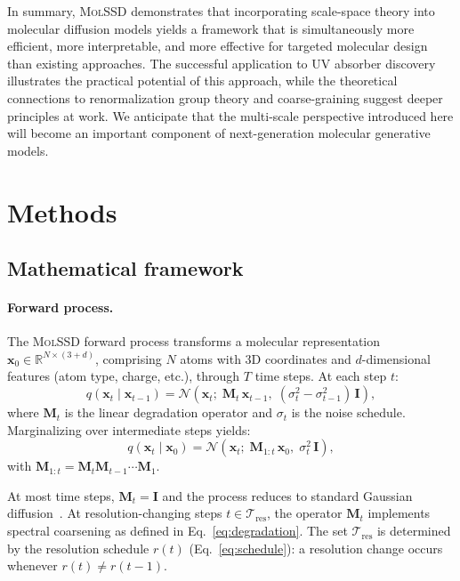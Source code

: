 \documentclass[11pt]{article}
\newcommand{\molssd}{\textsc{MolSSD}}
\newcommand{\vx}{\mathbf{x}}
\newcommand{\mM}{\mathbf{M}}
\newcommand{\mI}{\mathbf{I}}
\newcommand{\normal}{\mathcal{N}}
\newcommand{\R}{\mathbb{R}}
\begin{document}
In summary, \molssd{} demonstrates that incorporating scale-space theory into molecular diffusion models yields a framework that is simultaneously more efficient, more interpretable, and more effective for targeted molecular design than existing approaches. The successful application to UV absorber discovery illustrates the practical potential of this approach, while the theoretical connections to renormalization group theory and coarse-graining suggest deeper principles at work. We anticipate that the multi-scale perspective introduced here will become an important component of next-generation molecular generative models.


\section*{Methods}

\subsection*{Mathematical framework}

\paragraph{Forward process.}
The \molssd{} forward process transforms a molecular representation $\vx_0 \in \R^{N \times (3+d)}$, comprising $N$ atoms with 3D coordinates and $d$-dimensional features (atom type, charge, etc.), through $T$ time steps. At each step $t$:
\begin{equation}
\label{eq:forward_full}
    q(\vx_t \mid \vx_{t-1}) = \normal\!\left(\vx_t;\; \mM_t\,\vx_{t-1},\; (\sigma_t^2 - \sigma_{t-1}^2)\,\mI\right),
\end{equation}
where $\mM_t$ is the linear degradation operator and $\sigma_t$ is the noise schedule. Marginalizing over intermediate steps yields:
\begin{equation}
    q(\vx_t \mid \vx_0) = \normal\!\left(\vx_t;\; \mM_{1:t}\,\vx_0,\; \sigma_t^2\,\mI\right),
\end{equation}
with $\mM_{1:t} = \mM_t \mM_{t-1} \cdots \mM_1$.

At most time steps, $\mM_t = \mI$ and the process reduces to standard Gaussian diffusion~\cite{ho2020ddpm}. At resolution-changing steps $t \in \mathcal{T}_{\text{res}}$, the operator $\mM_t$ implements spectral coarsening as defined in Eq.~\eqref{eq:degradation}. The set $\mathcal{T}_{\text{res}}$ is determined by the resolution schedule $r(t)$ (Eq.~\eqref{eq:schedule}): a resolution change occurs whenever $r(t) \neq r(t-1)$.
\end{document}
